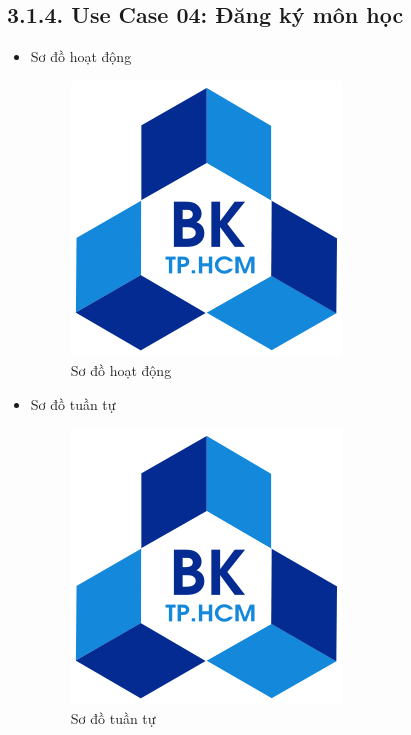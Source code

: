 \subsection*{3.1.4. Use Case 04: Đăng ký môn học}
\begin{itemize}
    \item Sơ đồ hoạt động
    \begin{figure}[H]
    \centering
    \includegraphics[scale=0.5 ]{Picture/hcmut.png}
    \caption{Sơ đồ hoạt động }
    \end{figure}
    \item Sơ đồ tuần tự
    \begin{figure}[H]
    \centering
    \includegraphics[scale=0.5 ]{Picture/hcmut.png}
    \caption{Sơ đồ tuần tự }
    \end{figure}
\end{itemize}
